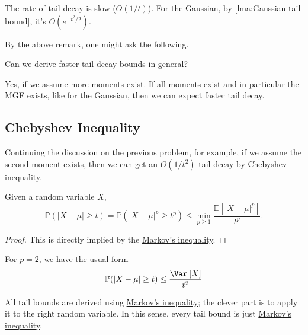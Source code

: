 \begin{remark}
	The rate of tail decay is slow (\(O(1 / t)\)). For the Gaussian, by \autoref{lma:Gaussian-tail-bound}, it's \(O(e^{-t^2 / 2})\).
\end{remark}

By the above remark, one might ask the following.

\begin{problem*}
	Can we derive faster tail decay bounds in general?
\end{problem*}
\begin{answer}
	Yes, if we assume more moments exist. If all moments exist and in particular the MGF exists, like for the Gaussian, then we can expect faster tail decay.
\end{answer}

\subsection{Chebyshev Inequality}
Continuing the discussion on the previous problem, for example, if we assume the second moment exists, then we can get an \(O(1 / t^2)\) tail decay by \hyperref[lma:Chebyshev-inequality]{Chebyshev inequality}.

\begin{lemma}\label{lma:Chebyshev-inequality}
	Given a random variable \(X\),
	\[
		\mathbb{P} (\vert X - \mu  \vert \geq t ) = \mathbb{P} (\vert X - \mu  \vert^p \geq t ^p) \leq \min _{p \geq 1} \frac{\mathbb{E}_{}\left[\vert X-\mu  \vert^p \right] }{t^p}.
	\]
\end{lemma}
\begin{proof}
	This is directly implied by the \hyperref[lma:Markov-inequality]{Markov's inequality}.
\end{proof}

\begin{remark}
	For \(p = 2\), we have the usual form
	\[
		\mathbb{P} (\vert X - \mu  \vert \geq t) \leq \frac{\Var_{}\left[X \right] }{t^2}
	\]
\end{remark}

\begin{remark}
	All tail bounds are derived using \hyperref[lma:Markov-inequality]{Markov's inequality}; the clever part is to apply it to the right random variable. In this sense, every tail bound is just \hyperref[lma:Markov-inequality]{Markov's inequality}.
\end{remark}

